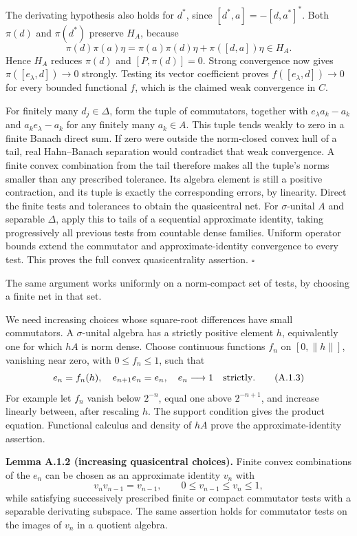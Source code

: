 \documentclass[
  11pt,
]{article}
\begin{document}
The derivating hypothesis also holds for \(d^*\), since
\([d^*,a]=-[d,a^*]^*\). Both \(\pi(d)\) and \(\pi(d^*)\) preserve
\(H_A\), because \[
\pi(d)\pi(a)\eta
=\pi(a)\pi(d)\eta+\pi([d,a])\eta\in H_A.
\] Hence \(H_A\) reduces \(\pi(d)\) and \([P,\pi(d)]=0\). Strong
convergence now gives \(\pi([e_\lambda,d])\to0\) strongly. Testing its
vector coefficient proves \(f([e_\lambda,d])\to0\) for every bounded
functional \(f\), which is the claimed weak convergence in \(C\).

For finitely many \(d_j\in\Delta\), form the tuple of commutators,
together with \(e_\lambda a_k-a_k\) and \(a_ke_\lambda-a_k\) for any
finitely many \(a_k\in A\). This tuple tends weakly to zero in a finite
Banach direct sum. If zero were outside the norm-closed convex hull of a
tail, real Hahn--Banach separation would contradict that weak
convergence. A finite convex combination from the tail therefore makes
all the tuple's norms smaller than any prescribed tolerance. Its algebra
element is still a positive contraction, and its tuple is exactly the
corresponding errors, by linearity. Direct the finite tests and
tolerances to obtain the quasicentral net. For \(\sigma\)-unital \(A\)
and separable \(\Delta\), apply this to tails of a sequential
approximate identity, taking progressively all previous tests from
countable dense families. Uniform operator bounds extend the commutator
and approximate-identity convergence to every test. This proves the full
convex quasicentrality assertion. \(\square\)

The same argument works uniformly on a norm-compact set of tests, by
choosing a finite net in that set.

We need increasing choices whose square-root differences have small
commutators. A \(\sigma\)-unital algebra has a strictly positive element
\(h\), equivalently one for which \(hA\) is norm dense. Choose
continuous functions \(f_n\) on \([0,\|h\|]\), vanishing near zero, with
\(0\leq f_n\leq1\), such that \[
e_n=f_n(h),\quad e_{n+1}e_n=e_n,\quad e_n\longrightarrow1
\quad\hbox{strictly}.
\tag{A.1.3}
\] For example let \(f_n\) vanish below \(2^{-n}\), equal one above
\(2^{-n+1}\), and increase linearly between, after rescaling \(h\). The
support condition gives the product equation. Functional calculus and
density of \(hA\) prove the approximate-identity assertion.

\textbf{Lemma A.1.2 (increasing quasicentral choices).} Finite convex
combinations of the \(e_n\) can be chosen as an approximate identity
\(v_n\) with \[
v_nv_{n-1}=v_{n-1},\qquad 0\leq v_{n-1}\leq v_n\leq1,
\tag{A.1.4}
\] while satisfying successively prescribed finite or compact commutator
tests with a separable derivating subspace. The same assertion holds for
commutator tests on the images of \(v_n\) in a quotient algebra.
\end{document}
